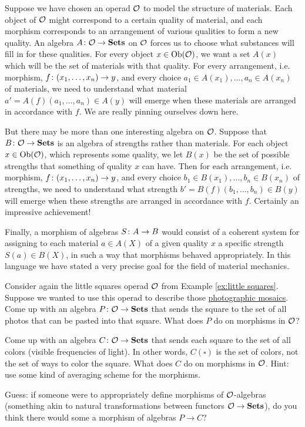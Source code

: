 \documentclass[CT4S-EN-RU]{subfiles}
\begin{document}
\begin{application}
\end{application}

\begin{application}

Suppose we have chosen an operad $\mathcal{O}$ to model the structure of materials. Each object of $\mathcal{O}$ might correspond to a certain quality of material, and each morphism corresponds to an arrangement of various qualities to form a new quality. An algebra $A\colon\mathcal{O}\rightarrow{\bf Sets}$ on $\mathcal{O}$ forces us to choose what substances will fill in for these qualities. For every object $x\in\textnormal{Ob}(\mathcal{O})$, we want a set $A(x)$ which will be the set of materials with that quality. For every arrangement, i.e. morphism, $f\colon (x_1,\ldots,x_n)\rightarrow y$, and every choice $a_1\in A(x_1), \ldots, a_n\in A(x_n)$ of materials, we need to understand what material $a'=A(f)(a_1,\ldots,a_n)\in A(y)$ will emerge when these materials are arranged in accordance with $f$. We are really pinning ourselves down here.

But there may be more than one interesting algebra on $\mathcal{O}$. Suppose that $B\colon\mathcal{O}\rightarrow{\bf Sets}$ is an algebra of strengths rather than materials. For each object $x\in\textnormal{Ob}(\mathcal{O})$, which represents some quality, we let $B(x)$ be the set of possible strengths that something of quality $x$ can have. Then for each arrangement, i.e. morphism, $f\colon (x_1,\ldots,x_n)\rightarrow y$, and every choice $b_1\in B(x_1), \ldots, b_n\in B(x_n)$ of strengths, we need to understand what strength $b'=B(f)(b_1,\ldots,b_n)\in B(y)$ will emerge when these strengths are arranged in accordance with $f$. Certainly an impressive achievement!

Finally, a morphism of algebras $S\colon A\rightarrow B$ would consist of a coherent system for assigning to each material $a\in A(X)$ of a given quality $x$ a specific strength $S(a)\in B(X)$, in such a way that morphisms behaved appropriately. In this language we have stated a very precise goal for the field of material mechanics.

\end{application}

\begin{exercise}
Consider again the little squares operad $\mathcal{O}$ from Example \ref{ex:little squares}. Suppose we wanted to use this operad to describe those \href{http://en.wikipedia.org/wiki/Photographic_mosaic}{\text photographic mosaics}. 
\sexc Come up with an algebra $P\colon\mathcal{O}\rightarrow{\bf Sets}$ that sends the square to the set of all photos that can be pasted into that square. What does $P$ do on morphisms in $\mathcal{O}$?
\item Come up with an algebra $C\colon\mathcal{O}\rightarrow{\bf Sets}$ that sends each square to the set of all colors (visible frequencies of light). In other words, $C(\square)$ is the set of colors, not the set of ways to color the square. What does $C$ do on morphisms in $\mathcal{O}$. Hint: use some kind of averaging scheme for the morphisms.
\item Guess: if someone were to appropriately define morphisms of $\mathcal{O}$-algebras (something akin to natural transformations between functors $\mathcal{O}\rightarrow{\bf Sets}$), do you think there would some a morphism of algebras $P\to C$?
\endsexc
\end{exercise}
\end{document}
